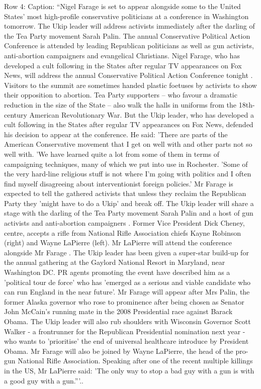 \begin{table}[H]
\centering
\caption{Row 4\ifshowcaption{}: Caption: ``Nigel Farage is set to appear alongside some to the United States' most high-profile conservative politicians at a conference in Washington tomorrow. The Ukip leader will address activists immediately after the darling of the Tea Party movement Sarah Palin. The annual Conservative Political Action Conference is attended by leading Republican politicians as well as gun activists, anti-abortion campaigners and evangelical Christians. Nigel Farage, who has developed a cult following in the States after regular TV appearances on Fox News, will address the annual Conservative Political Action Conference tonight . Visitors to the summit are sometimes handed plastic foetuses by activists to show their opposition to abortion. Tea Party supporters – who favour a dramatic reduction in the size of the State – also walk the halls in uniforms from the 18th-century American Revolutionary War. But the Ukip leader, who has developed a cult following in the States after regular TV appearances on Fox News, defended his decision to appear at the conference. He said: 'There are parts of the American Conservative movement that I get on well with and other parts not so well with. 'We have learned quite a lot from some of them in terms of campaigning techniques, many of which we put into use in Rochester. 'Some of the very hard-line religious stuff is not where I'm going with politics and I often find myself disagreeing about interventionist foreign policies.' Mr Farage is expected to tell the gathered activists that unless they reclaim the Republican Party they 'might have to do a Ukip' and break off. The Ukip leader will share a stage with the darling of the Tea Party movement Sarah Palin and a host of gun activists and anti-abortion campaigners . Former Vice President Dick Cheney, centre, accepts a rifle from National Rifle Association chiefs Kayne Robinson (right) and Wayne LaPierre (left). Mr LaPierre will attend the conference alongside Mr Farage . The Ukip leader has been given a super-star build-up for the annual gathering at the Gaylord National Resort in Maryland, near Washington DC. PR agents promoting the event have described him as a 'political tour de force' who has 'emerged as a serious and viable candidate who can run England in the near future'. Mr Farage will appear after Mrs Palin, the former Alaska governor who rose to prominence after being chosen as Senator John McCain's running mate in the 2008 Presidential race against Barack Obama. The Ukip leader will also rub shoulders with Wisconsin Governor Scott Walker - a frontrunner for the Republican Presidential nomination next year - who wants to 'prioritise' the end of universal healthcare introduce by President Obama. Mr Farage will also be joined by Wayne LaPierre, the head of the pro-gun National Rifle Association. Speaking after one of the recent multiple killings in the US, Mr LaPierre said: 'The only way to stop a bad guy with a gun is with a good guy with a gun.'''.\else.}

\end{table}
